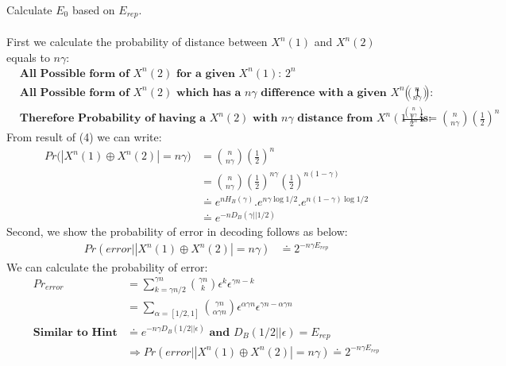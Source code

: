 \documentclass[
  course = {{EE623 Information Theory}},
  quartile = {{Fall 2020}},
  assignment = 8,
  name = {{Mohammad Mahdi Rahimi}},
  studentnumber = {{20208244}},
  email = {{mahi@kaist.ac.kr}},
  firstexercise = 1
]{aga-homework}
\begin{document}
\newpage

\subexercise Calculate $E_0$ based on $E_{rep}$.
\\\\
First we calculate the probability of distance between $X^n(1)$ and $X^n(2)$ equals to $n\gamma$:
\begin{equation} \label{eq4}
\begin{split}
& \textbf{All Possible form of $X^n(2)$ for a given $X^n(1)$: } 2^n \\
& \textbf{All Possible form of $X^n(2)$ which has a $n\gamma$ difference with a given $X^n(1)$: } \binom{n}{n\gamma}\\
& \textbf{Therefore Probability of having a $X^n(2)$ with $n\gamma$ distance from $X^n(1)$ is: } \frac{\binom{n}{n\gamma}}{2^n} = \binom{n}{n\gamma}\left(\frac{1}{2}\right)^n
\end{split}
\end{equation}
From result of (4) we can write:
\begin{equation} \label{eq5}
\begin{split}
Pr\big(\left|X^n(1) \oplus X^n(2)\right| = n\gamma\big) & = \binom{n}{n\gamma}\left(\frac{1}{2}\right)^n\\
& = \binom{n}{n\gamma}\left(\frac{1}{2}\right)^{n\gamma}\left(\frac{1}{2}\right)^{n(1-\gamma)}\\
& \doteq e^{nH_B(\gamma)} . e^{n\gamma\log1/2} . e^{n(1 - \gamma)\log1/2}\\
& \doteq e^{-nD_B(\gamma || 1/2)}
\end{split}
\end{equation}
Second, we show the probability of error in decoding follows as below:
\begin{equation} \label{eq6}
\begin{split}
Pr\left(error\Big|\left|X^n(1) \oplus X^n(2)\right| = n\gamma \right) & \doteq 2^{-n\gamma E_{rep}}
\end{split}
\end{equation}
We can calculate the probability of error:
\begin{equation} \label{eq7}
\begin{split}
Pr_{error} & = \sum^{\gamma n}_{k = \gamma n / 2} \binom{\gamma n}{k} \epsilon^{k} \epsilon^{\gamma n - k}\\
& = \sum_{\alpha = [1/2, 1]} \binom{\gamma n}{\alpha \gamma n} \epsilon^{\alpha \gamma n} \epsilon^{\gamma n - \alpha \gamma n}\\
\textbf{Similar to Hint} & \doteq e^{-n \gamma D_B(1/2 || \epsilon)} \textbf{ and } D_B(1/2 || \epsilon) = E_{rep}\\
& \Rightarrow Pr\left(error\Big|\left|X^n(1) \oplus X^n(2)\right| = n\gamma \right) \doteq 2^{-n\gamma E_{rep}}
\end{split}
\end{equation}
\end{document}
